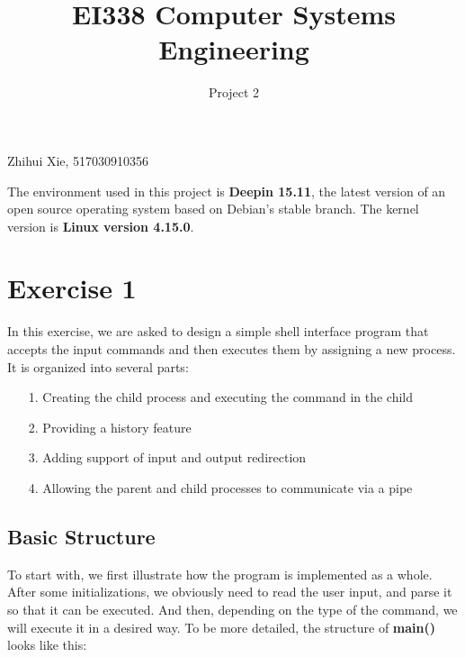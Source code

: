 \documentclass{article}
\title{EI338 Computer Systems Engineering}
\author{Project 2}
\begin{document}
\maketitle

\begin{center}
    Zhihui Xie, 517030910356
\end{center}

The environment used in this project is \textbf{Deepin 15.11}, the latest version of an open source operating system based on Debian's stable branch. The kernel version is \textbf{Linux version 4.15.0}.

\section*{Exercise 1}
In this exercise, we are asked to design a simple shell interface program that accepts the input commands and then executes them by assigning a new process. It is organized into several parts:

\begin{itemize}
    \item[1.] Creating the child process and executing the command in the child
    \item[2.] Providing a history feature
    \item[3.] Adding support of input and output redirection
    \item[4.] Allowing the parent and child processes to communicate via a pipe
\end{itemize}

\subsection*{Basic Structure}
To start with, we first illustrate how the program is implemented as a whole. After some initializations, we obviously need to read the user input, and parse it so that it can be executed. And then, depending on the type of the command, we will execute it in a desired way. To be more detailed, the structure of \textbf{main()} looks like this:
\end{document}
